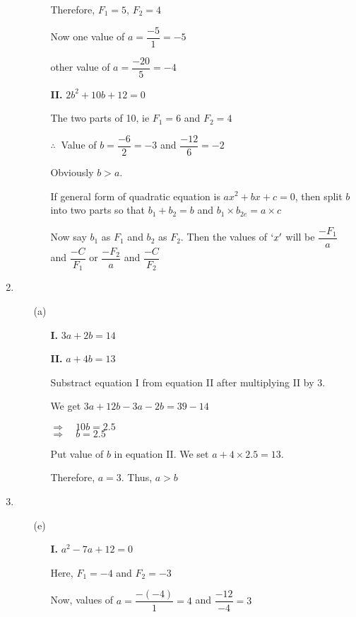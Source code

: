 \begin{multicols}{2}
\begin{enumerate}
\begin{itemize}
\begin{itemize}
      Therefore, $F_1 = 5$, $F_2 = 4$

      Now one value of $a = \dfrac{-5}{1} = -5$

      other value of $a = \dfrac{-20}{5} = -4$

    \item[{\bf II.}] $2b^2 + 10b + 12 = 0$

      The two parts of 10, ie $F_1 = 6$ and $F_2 = 4$

      $\therefore~$ Value of $b = \dfrac{-6}{2} = -3$ and $\dfrac{-12}{6} = -2$

      Obviously $b > a$.

      If general form of quadratic equation is $ax^2 + bx + c = 0$, then split $b$ into two parts so that $b_1 + b_2 = b$ and $b_1 \times b_{2e} = a \times c$

      Now say $b_1$ as $F_1$ and $b_2$ as $F_2$. Then the values of $`x'$ will be $\dfrac{-F_1}{a}$ and $\dfrac{-C}{F_1}$ or $\dfrac{-F_2}{a}$ and $\dfrac{-C}{F_2}$
      \end{itemize}
    \end{itemize}
\item
  \begin{itemize}
  \item[(a)]
    \begin{itemize}
    \item[{\bf I.}] $3a + 2b = 14$
    \item[{\bf II.}] $a + 4b = 13$

      Substract equation I from equation II after multiplying II by 3.

      We get $3a + 12b - 3a - 2b = 39 - 14$

      $\Rightarrow\quad 10b = 2.5$\\
      $\Rightarrow\quad b = 2.5$

      Put value of $b$ in equation II. We set $a + 4 \times 2.5 = 13$.

      Therefore, $a = 3$. Thus, $a > b$
      \end{itemize}
  \end{itemize}
\item
  \begin{itemize}
  \item[(e)]
    \begin{itemize}
    \item[{\bf I.}] $a^2 - 7a + 12 = 0$

      Here, $F_1 = -4$ and $F_2 = -3$

      Now, values of $a = \dfrac{-(-4)}{1} = 4$ and $\dfrac{-12}{-4} = 3$


\end{itemize}
\end{itemize}
\end{enumerate}
\end{multicols}
